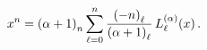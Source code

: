 \[x^{n}=\left(\alpha+1\right)_{n}\sum_{\ell=0}^{n}\frac{\left(-n\right)_{\ell}}{%
\left(\alpha+1\right)_{\ell}}\mathop{L^{(\alpha)}_{\ell}\/}\nolimits\!\left(x%
\right).\]